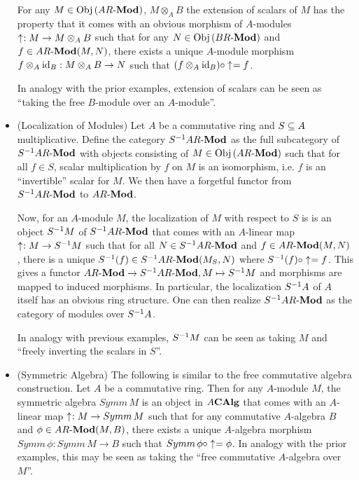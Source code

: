 \begin{eg}
\begin{itemize}
    For any $M \in \mathrm{Obj}\left(AR\text{-}\mathbf{Mod}\right)$, 
    $M \otimes_A B$ the extension of scalars of $M$ has the property that
    it comes with an obvious morphism of $A$-modules 
    $\uparrow_{}^{} : M \to M \otimes_A B$ such that 
    for any $N \in \mathrm{Obj}\left(BR\text{-}\mathbf{Mod}\right)$ and $f \in AR\text{-}\mathbf{Mod}(M,N)$, 
    there exists a unique $A$-module morphism 
    $f \otimes_A \mathrm{id}_{B} : M \otimes_A B \to N$ such that 
    $(f\otimes_A \mathrm{id}_{B}) \circ \uparrow_{}^{} = f$.

    In analogy with the prior examples,
    extension of scalars can be seen as 
    ``taking the free $B$-module over an $A$-module''.

    \item (Localization of Modules)
    Let $A$ be a commutative ring and $S \subseteq A$ multiplicative. 
    Define the category $S^{-1} AR\text{-}\mathbf{Mod}$ as the full subcategory of $S^{-1} AR\text{-}\mathbf{Mod}$ 
    with objects consisting of $M \in \mathrm{Obj}\left(AR\text{-}\mathbf{Mod}\right)$ such that 
    for all $f \in S$, scalar multiplication by $f$ on $M$ is an isomorphism,
    i.e. $f$ is an ``invertible'' scalar for $M$.
    We then have a forgetful functor from $S^{-1} AR\text{-}\mathbf{Mod}$ to $AR\text{-}\mathbf{Mod}$.

    Now, for an $A$-module $M$, 
    the localization of $M$ with respect to $S$ is 
    is an object $S^{-1} M$ of $S^{-1} AR\text{-}\mathbf{Mod}$ that comes with 
    an $A$-linear map $\uparrow_{}^{} : M \to S^{-1} M$ such that 
    for all $N \in S^{-1} AR\text{-}\mathbf{Mod}$ and $f \in AR\text{-}\mathbf{Mod}(M,N)$,
    there is a unique $S^{-1}(f) \in S^{-1} AR\text{-}\mathbf{Mod}(M_S,N)$ where 
    $S^{-1}(f) \circ \uparrow_{}^{} = f$.
    This gives a functor $AR\text{-}\mathbf{Mod} \to S^{-1} AR\text{-}\mathbf{Mod}, M \mapsto S^{-1} M$
    and morphisms are mapped to induced morphisms. 
    In particular, the localization $S^{-1} A$ of $A$ itself 
    has an obvious ring structure.
    One can then realize $S^{-1} AR\text{-}\mathbf{Mod}$ as 
    the category of modules over $S^{-1} A$.

    In analogy with previous examples,
    $S^{-1} M$ can be seen as taking $M$ and 
    ``freely inverting the scalars in $S$''.

    \item (Symmetric Algebra)
    The following is similar to the free commutative algebra construction.
    Let $A$ be a commutative ring.
    Then for any $A$-module $M$,
    the symmetric algebra $Symm\,M$ is an object in $A\mathbf{CAlg}$ 
    that comes with an $A$-linear map $\uparrow_{}^{} : M \to Symm\,M$
    such that for any commutative $A$-algebra $B$ and $\phi \in AR\text{-}\mathbf{Mod}(M,B)$,
    there exists a unique $A$-algebra morphism $Symm\,\phi : Symm\,M \to B$
    such that $Symm\,\phi \circ \uparrow_{}^{} = \phi$.
    In analogy with the prior examples,
    this may be seen as taking the ``free commutative $A$-algebra over $M$''.


\end{itemize}
\end{eg}
